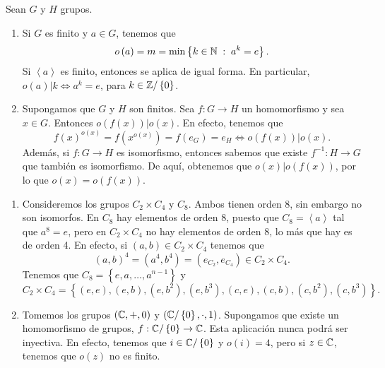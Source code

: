 \begin{observation} Sean $\displaystyle G $ y $\displaystyle H $ grupos.
\begin{enumerate}
\item Si $\displaystyle G $ es finito y $\displaystyle a \in G $, tenemos que 
	\[o\left(a\right) = m = \min \left\{ k \in \mathbb{N} \; :\; a^{k} = e\right\}  .\]
	Si $\displaystyle \left\langle a \right\rangle  $ es finito, entonces se aplica de igual forma. En particular, $\displaystyle o\left(a\right) | k \iff a^{k} = e $, para $\displaystyle k \in \mathbb{Z} / \left\{ 0\right\}  $.
\item Supongamos que $\displaystyle G $ y $\displaystyle H $ son finitos. Sea $\displaystyle f : G \to H $ un homomorfismo y sea $\displaystyle x \in G $. Entonces $\displaystyle o\left(f\left(x\right)\right) | o\left(x\right) $. En efecto, tenemos que
	\[f\left(x\right)^{o\left(x\right)} = f\left(x^{o\left(x\right)}\right) = f\left(e_{G}\right) = e_{H} \iff o\left(f\left(x\right)\right) | o\left(x\right) .\]
Además, si $\displaystyle f : G \to H $ es isomorfismo, entonces sabemos que existe $\displaystyle f^{-1} : H \to G $ que también es isomorfismo. De aquí, obtenemos que $\displaystyle o\left(x\right) | o\left(f\left(x\right)\right) $, por lo que $\displaystyle o\left(x\right) = o\left(f\left(x\right)\right) $.	
\end{enumerate}
\end{observation}
\begin{eg}
\begin{enumerate}
\item Consideremos los grupos $\displaystyle C_{2} \times C_{4} $ y $\displaystyle C_{8} $. Ambos tienen orden 8, sin embargo no son isomorfos. En $\displaystyle C_{8} $ hay elementos de orden 8, puesto que $\displaystyle C_{8} = \left\langle a \right\rangle  $ tal que $\displaystyle a^{8} = e $, pero en $\displaystyle C_{2} \times C_{4} $ no hay elementos de orden 8, lo más que hay es de orden 4. En efecto, si $\displaystyle \left(a,b\right) \in C_{2} \times C_{4} $ tenemos que
	\[ \left(a,b\right)^{4} = \left(a^{4}, b^{4}\right) = \left(e_{C_{2}}, e_{C_{4}}\right) \in C_{2} \times C_{4}.\]
	Tenemos que $\displaystyle C_{8} = \left\{ e, a, \ldots, a^{n-1}\right\}  $ y 
	\[C_{2} \times C_{4} = \left\{ \left(e,e\right), \left(e,b\right), \left(e,b^{2}\right), \left(e,b^{3}\right), \left(c,e\right), \left(c,b\right), \left(c,b^{2}\right), \left(c,b^{3}\right)\right\}  .\]
\item Tomemos los grupos $\displaystyle \left(\mathbb{C}, +, 0\right) $ y $\displaystyle \left(\mathbb{C} / \left\{ 0\right\} , \cdot, 1\right) $. Supongamos que existe un homomorfismo de grupos, $\displaystyle f : \mathbb{C}/ \left\{ 0\right\}  \to \mathbb{C} $. Esta aplicación nunca podrá ser inyectiva. En efecto, tenemos que $\displaystyle i \in \mathbb{C}/ \left\{ 0\right\}  $ y $\displaystyle o\left(i\right) = 4 $, pero si $\displaystyle z \in \mathbb{C} $, tenemos que $\displaystyle o\left(z\right) $ no es finito. 
\end{enumerate}
\end{eg}
